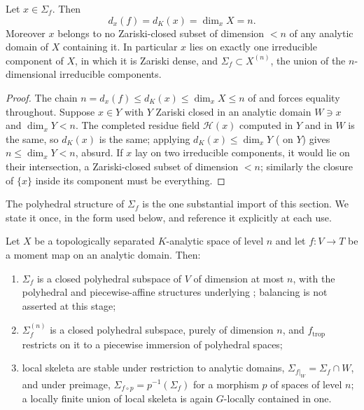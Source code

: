 \begin{corollary}
\label{cor:trop-sigma-abhyankar}
Let $x\in\Sigma_f$. Then
\[
 d_x(f)=d_K(x)=\dim_xX=n .
\]
Moreover $x$ belongs to no Zariski-closed subset of dimension $<n$ of any
analytic domain of $X$ containing it. In particular $x$ lies on exactly one
irreducible component of $X$, in which it is Zariski dense, and
$\Sigma_f\subset X^{(n)}$, the union of the $n$-dimensional irreducible
components.
\end{corollary}

\begin{proof}
The chain $n=d_x(f)\le d_K(x)\le\dim_xX\le n$ of
 and
 forces equality throughout. Suppose
$x\in Y$ with $Y$ Zariski closed in an analytic domain $W\ni x$ and
$\dim_xY<n$. The completed residue field $\mathcal H(x)$ computed in $Y$ and
in $W$ is the same, so $d_K(x)$ is the same; applying
$d_K(x)\le\dim_xY$ ( on $Y$) gives
$n\le\dim_xY<n$, absurd. If $x$ lay on two irreducible components, it would
lie on their intersection, a Zariski-closed subset of dimension $<n$;
similarly the closure of $\{x\}$ inside its component must be everything.
\end{proof}

The polyhedral structure of $\Sigma_f$ is the one substantial import of this
section. We state it once, in the form used below, and reference it
explicitly at each use.

\begin{theorem}
\label{thm:trop-sigma-polyhedral}
Let $X$ be a topologically separated $K$-analytic space of level $n$ and let
$f:V\to T$ be a moment map on an analytic domain. Then:
\begin{enumerate}
\item\label{itm:trop-poly:para} $\Sigma_f$ is a closed polyhedral subspace of
  $V$ of dimension at most $n$, with the polyhedral and piecewise-affine
  structures underlying ; balancing is not
  asserted at this stage;
\item\label{itm:trop-poly:top} $\Sigma_f^{(n)}$ is a closed polyhedral
  subspace, purely of dimension $n$, and $f_{\mathrm{trop}}$ restricts on it
  to a piecewise immersion of polyhedral spaces;
\item\label{itm:trop-poly:union} local skeleta are stable under
  restriction to analytic domains, $\Sigma_{f|_W}=\Sigma_f\cap W$, and under
  preimage, $\Sigma_{f\circ p}=p^{-1}(\Sigma_f)$ for a morphism $p$ of
  spaces of level $n$; a locally finite union of local skeleta is again
  $G$-locally contained in one.
\end{enumerate}
\end{theorem}

